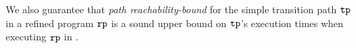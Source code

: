 We also guarantee that \emph{path reachability-bound} for the simple transition path $\mathtt{tp}$ in a refined program $\mathtt{rp}$ is a sound upper bound on $\mathtt{tp}$'s execution times when executing $\mathtt{rp}$
in .
%


